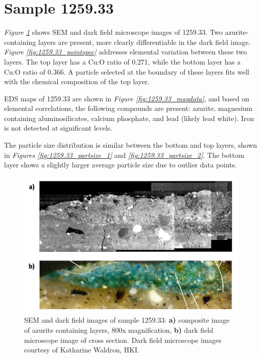 \section{Sample 1259.33}

\textit{Figure \ref{fig:1259.33_imgs}} shows SEM and dark field microscope images of 1259.33. Two azurite-containing layers are present, more clearly differentiable in the dark field image. \textit{Figure \ref{fig:1259.33_pointspec}} addresses elemental variation between these two layers. The top layer has a Cu:O ratio of 0.271, while the bottom layer has a Cu:O ratio of 0.366. A particle selected at the boundary of these layers fits well with the chemical composition of the top layer. 

EDS maps of 1259.33 are shown in \textit{Figure \ref{fig:1259.33_mapdata}}, and based on elemental correlations, the following compounds are present: azurite, magnesium containing aluminosilicates, calcium phosphate, and lead (likely lead white). Iron is not detected at significant levels.

The particle size distribution is similar between the bottom and top layers, shown in \textit{Figures \ref{fig:1259.33_partsize_1}} and \textit{\ref{fig:1259.33_partsize_2}}. The bottom layer shows a slightly larger average particle size due to outlier data points.

\begin{figure}[H]
  \centering
  \includegraphics[width=0.8\linewidth]{1259.33_imgs}
\caption[SEM and dark field images of sample 1259.33.]{SEM and dark field images of sample 1259.33: \textbf{a)} composite image of azurite containing layers, 800x magnification, \textbf{b)} dark field microscope image of cross section. Dark field microscope images courtesy of Katharine Waldron, HKI.}
\label{fig:1259.33_imgs}
\end{figure}

